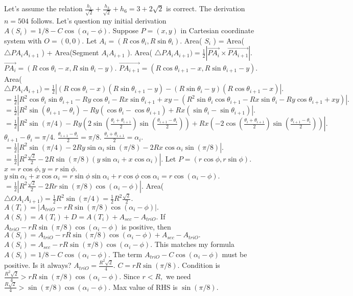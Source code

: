 Let's assume the relation $\frac{h_1}{\sqrt{2}} + \frac{h_3}{\sqrt{2}} + h_6 = 3+2\sqrt{2}$ is correct. The derivation $n=504$ follows. 
Let's question my initial derivation $A(S_i) = 1/8 - C \cos(\alpha_i - \phi).$ 
Suppose $P=(x,y)$ in Cartesian coordinate system with $O=(0,0).$ Let $A_i=(R\cos\theta_i, R\sin\theta_i).$ 
Area( $S_i$ ) = Area( $\triangle PA_iA_{i+1}$ ) + Area(Segment $A_iA_{i+1}$ ). 
Area( $\triangle PA_iA_{i+1}) = \frac{1}{2} | \vec{PA_i} \times \vec{PA_{i+1}} |.$ 
$\vec{PA_i} = (R\cos\theta_i - x, R\sin\theta_i - y).$ 
$\vec{PA_{i+1}} = (R\cos\theta_{i+1} - x, R\sin\theta_{i+1} - y).$ 
Area( $\triangle PA_iA_{i+1}) = \frac{1}{2} | (R\cos\theta_i - x)(R\sin\theta_{i+1} - y) - (R\sin\theta_i - y)(R\cos\theta_{i+1} - x) |.$ 
$= \frac{1}{2} | R^2 \cos\theta_i \sin\theta_{i+1} - R y \cos\theta_i - R x \sin\theta_{i+1} + xy - (R^2 \sin\theta_i \cos\theta_{i+1} - R x \sin\theta_i - R y \cos\theta_{i+1} + xy) |.$ 
$= \frac{1}{2} | R^2 \sin(\theta_{i+1}-\theta_i) - R y (\cos\theta_i - \cos\theta_{i+1}) + R x (\sin\theta_i - \sin\theta_{i+1}) |.$ 
$= \frac{1}{2} | R^2 \sin(\pi/4) - Ry (2\sin(\frac{\theta_i+\theta_{i+1}}{2})\sin(\frac{\theta_{i+1}-\theta_i}{2})) + Rx ( -2\cos(\frac{\theta_i+\theta_{i+1}}{2})\sin(\frac{\theta_{i+1}-\theta_i}{2})) |.$ 
$\theta_{i+1}-\theta_i = \pi/4.$ $\frac{\theta_{i+1}-\theta_i}{2}=\pi/8.$ $\frac{\theta_i+\theta_{i+1}}{2} = \alpha_i.$ 
$= \frac{1}{2} | R^2 \sin(\pi/4) - 2 Ry \sin\alpha_i \sin(\pi/8) - 2 Rx \cos\alpha_i \sin(\pi/8) |.$ 
$= \frac{1}{2} | R^2 \frac{\sqrt{2}}{2} - 2 R \sin(\pi/8) (y \sin\alpha_i + x \cos\alpha_i) |.$ 
Let $P = (r\cos\phi, r\sin\phi).$ $x=r\cos\phi, y=r\sin\phi.$ 
$y \sin\alpha_i + x \cos\alpha_i = r\sin\phi \sin\alpha_i + r\cos\phi \cos\alpha_i = r \cos(\alpha_i - \phi).$ 
$= \frac{1}{2} | R^2 \frac{\sqrt{2}}{2} - 2 R r \sin(\pi/8) \cos(\alpha_i - \phi) |.$ 
Area( $\triangle OA_iA_{i+1}) = \frac{1}{2} R^2 \sin(\pi/4) = \frac{1}{2} R^2 \frac{\sqrt{2}}{2}.$ 
$A(T_i) = | A_{triO} - r R \sin(\pi/8) \cos(\alpha_i - \phi) |.$ 
$A(S_i) = A(T_i) + D = A(T_i) + A_{sec} - A_{triO}.$ 
If $A_{triO} - r R \sin(\pi/8) \cos(\alpha_i - \phi)$ is positive, then $A(S_i) = A_{triO} - r R \sin(\pi/8) \cos(\alpha_i - \phi) + A_{sec} - A_{triO}.$ 
$A(S_i) = A_{sec} - r R \sin(\pi/8) \cos(\alpha_i - \phi).$ 
This matches my formula $A(S_i) = 1/8 - C \cos(\alpha_i - \phi).$ 
The term $A_{triO} - C \cos(\alpha_i - \phi)$ must be positive. Is it always? $A_{triO} = \frac{R^2\sqrt{2}}{4}.$ $C = rR \sin(\pi/8).$ 
Condition is $\frac{R^2\sqrt{2}}{4} > rR \sin(\pi/8) \cos(\alpha_i - \phi).$ 
Since $r<R,$ we need $\frac{R\sqrt{2}}{4} > \sin(\pi/8) \cos(\alpha_i - \phi).$ Max value of RHS is $\sin(\pi/8).$ 
